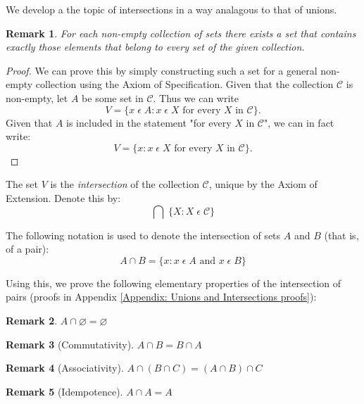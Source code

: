 \documentclass[12pt]{article}
\newtheorem{remark}{Remark}
\begin{document}
We develop a the topic of intersections in a way analagous to that of unions.
\begin{remark}
    For each non-empty collection of sets there exists a set that contains exactly those elements that
    belong to every set of the given collection.
\end{remark}
\begin{proof}
    We can prove this by simply constructing such a set for a general non-empty collection using the Axiom of Specification.
    Given that the collection $\mathcal{C}$ is non-empty, let $A$ be some set in $\mathcal{C}$.
    Thus we can write
    \begin{equation*}
        V = \{x\;\epsilon\;A: x\;\epsilon\;X \text{ for every } X\text{ in } \mathcal{C}\}.
    \end{equation*}
    Given that $A$ is included in the statement "for every $X$ in $\mathcal{C}$", we can in fact write:
    \begin{equation}
        V = \{x: x\;\epsilon\;X \text{ for every } X\text{ in } \mathcal{C}\}.
    \end{equation}
\end{proof}
The set $V$ is the \textit{intersection} of the collection $\mathcal{C}$, unique by the Axiom of Extension.
Denote this by:
\begin{equation}
    \bigcap\;\{X:X\;\epsilon\;\mathcal{C}\}
\end{equation}

The following notation is used to denote the intersection of sets $A$ and $B$ (that is, of a pair):
\begin{equation}
    A \cap B = \{x:x\;\epsilon\;A \text{ and } x\;\epsilon\;B\}
\end{equation}

Using this, we prove the following elementary properties of the intersection of pairs (proofs in Appendix \ref{Appendix: Unions and Intersections proofs}):
\begin{remark}
    $A \cap\varnothing = \varnothing$
\end{remark}

\begin{remark}[Commutativity]
    $A \cap B = B \cap A$
\end{remark}

\begin{remark}[Associativity]
    $A \cap (B \cap C) = (A \cap B) \cap C$
\end{remark}

\begin{remark}[Idempotence]
    $A \cap A = A$
\end{remark}
\end{document}
